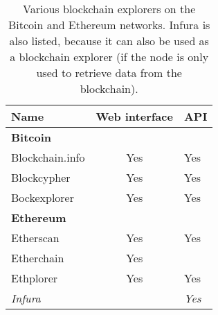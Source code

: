 \begin{table}[ht]
    \centering
    \begin{tabular}{|l c l|}
        \hline
        \textbf{Name}&\textbf{Web interface}&\textbf{API}\\
        \hline
        \multicolumn{3}{|l|}{\textbf{Bitcoin}}\\
        Blockchain.info&Yes&Yes\\
        Blockcypher&Yes&Yes\\
        Bockexplorer&Yes&Yes\\
        \hline
        \multicolumn{3}{|l|}{\textbf{Ethereum}}\\
        Etherscan&Yes&Yes\\
        Etherchain&Yes&\\
        Ethplorer&Yes&Yes\\
        \textit{Infura}&&\textit{Yes}\\
        \hline
    \end{tabular}
    \caption{Various blockchain explorers on the Bitcoin and Ethereum networks. Infura is also listed, because it can also be used as a blockchain explorer (if the node is only used to retrieve data from the blockchain).}
    \label{tab:block-explorers}
\end{table}

